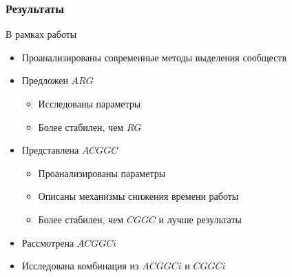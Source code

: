 

\begin{frame}
	\frametitle{Результаты}

	В рамках работы
	\begin{itemize}
		\item Проанализированы современные методы выделения сообществ
		\item Предложен $ARG$
		\begin{itemize}
			\item Исследованы параметры
			\item Более стабилен, чем $RG$
		\end{itemize}
		\item Представлена $ACGGC$
		\begin{itemize}
			\item Проанализированы параметры
			\item Описаны механизмы снижения времени работы
			\item Более стабилен, чем $CGGC$ и лучше результаты
		\end{itemize}
		\item Рассмотрена $ACGGCi$
		\item Исследована комбинация из $ACGGCi$ и $CGGCi$
	\end{itemize}
\end{frame}